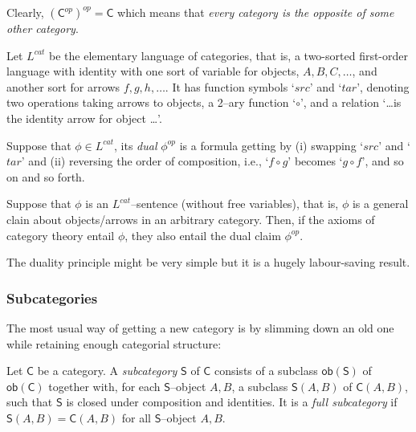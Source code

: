 Clearly, 
$(\mathsf{C}^{op})^{op} = \mathsf{C}$ which means that \textit{every category is the opposite of some other category}.


\vspace{1.5em}


Let {\color{purple} $L^{cat}$} be the elementary language of categories, 
that is, 
a {\color{teal} two-sorted first-order language} with identity with one sort of variable for objects, $A,B,C,\dots$, 
and another sort for arrows $f,g,h,\dots$. 
% 
It has function symbols `$src$' and `$tar$', 
denoting two operations taking arrows to objects, 
a 2--ary function `$\circ$', 
and a relation `\dots is the identity arrow for object \dots'. 


\begin{df}
	Suppose that $\phi \in L^{cat}$, 
	its \textit{dual} {\color{purple} $\phi^{op}$} is a formula getting by (i) swapping `$src$' and `$tar$' and (ii) reversing the order of composition, i.e., 
	`$f \circ g$' becomes `$g \circ f$', 
	and so on and so forth.
\end{df}



\begin{thm}
	Suppose that $\phi$ is an $L^{cat}$--sentence (without free variables), 
	that is, 
	$\phi$ is a general clain about objects/arrows in an arbitrary category. 
	Then, 
	if the axioms of category theory entail $\phi$,
	they also entail the dual claim $\phi^{op}$.
\end{thm}


The duality principle might be very simple but it is a hugely labour-saving result.








\subsubsection{Subcategories}

The most usual way of getting a new category is by slimming down an old one while retaining enough categorial structure:

\begin{df}[Subcategories]
	Let $\mathsf{C}$ be a category. 
	A \textit{subcategory} $\mathsf{S}$ of $\mathsf{C}$ consists of a subclass $\mathsf{ob(S)}$ of $\mathsf{ob(C)}$ together with, 
	for each $\mathsf{S}$--object $A,B$, 
	a subclass $\mathsf{S}(A,B)$ of $\mathsf{C}(A,B)$, 
	such that $\mathsf{S}$ is closed under composition and identities. 
	It is a \textit{full subcategory} if $\mathsf{S}(A,B) = \mathsf{C}(A,B)$ for all $\mathsf{S}$--object $A,B$.
\end{df}


